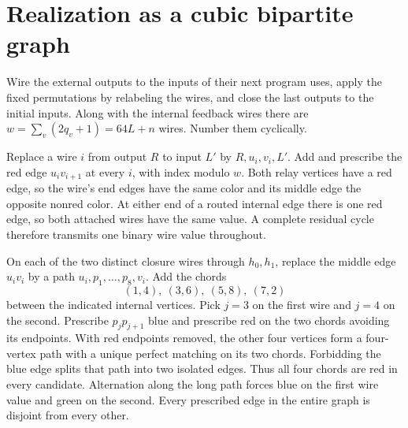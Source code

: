 \documentclass[12pt,letterpaper]{article}
\newcommand{\sh}[1]{\par\smallskip{\bfseries\color{ink}#1}\quad}
\newcommand{\Sec}[1]{\section{\color{ink}#1}}
\begin{document}
\newpage
\Sec{Realization as a cubic bipartite graph}
Wire the external outputs to the inputs of their next program uses, apply the fixed permutations by relabeling the wires, and close the last outputs to the initial inputs. Along with the internal feedback wires there are \(w=\sum_v(2q_v+1)=64L+n\) wires. Number them cyclically.

\sh{Relays.}
Replace a wire \(i\) from output \(R\) to input \(L'\) by \(R,u_i,v_i,L'\). Add and prescribe the red edge \(u_i v_{i+1}\) at every \(i\), with index modulo \(w\). Both relay vertices have a red edge, so the wire's end edges have the same color and its middle edge the opposite nonred color. At either end of a routed internal edge there is one red edge, so both attached wires have the same value. A complete residual cycle therefore transmits one binary wire value throughout.

\begin{center}
\end{center}

\sh{Two disjoint blue probes.}
On each of the two distinct closure wires through \(h_0,h_1\), replace the middle edge \(u_iv_i\) by a path \(u_i,p_1,\ldots,p_8,v_i\). Add the chords
\[
                   (1,4),\ (3,6),\ (5,8),\ (7,2)
\]
between the indicated internal vertices. Pick \(j=3\) on the first wire and \(j=4\) on the second. Prescribe \(p_jp_{j+1}\) blue and prescribe red on the two chords avoiding its endpoints. With red endpoints removed, the other four vertices form a four-vertex path with a unique perfect matching on its two chords. Forbidding the blue edge splits that path into two isolated edges. Thus all four chords are red in every candidate. Alternation along the long path forces blue on the first wire value and green on the second. Every prescribed edge in the entire graph is disjoint from every other.
\end{document}
